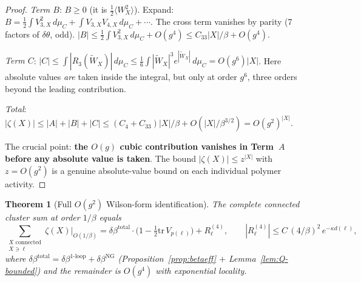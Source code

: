 \documentclass[11pt]{article}
\newtheorem{theorem}{Theorem}[section]
\theoremstyle{definition}
\newcommand{\tr}{\mathrm{tr}}
\begin{document}
\begin{proof}
\emph{Term $B$}: $B\ge 0$ (it is $\frac{1}{2}\langle W_X^2\rangle$).
Expand: $B=\frac{1}{2}\int V_{3,X}^2\,d\mu_C
+\int V_{3,X}V_{4,X}\,d\mu_C+\cdots$.
The cross term vanishes by parity (7 factors of $\delta\theta$, odd).
$|B|\le\frac{1}{2}\int V_{3,X}^2\,d\mu_C+O(g^4)
\le C_{33}|X|/\beta+O(g^4)$.

\emph{Term $C$}: $|C|\le\int|R_3(\widetilde{W}_X)|\,d\mu_C
\le\frac{1}{6}\int|\widetilde{W}_X|^3 e^{|\widetilde{W}_X|}\,d\mu_C
=O(g^6)|X|$.
Here absolute values \emph{are} taken inside the integral, but only
at order $g^6$, three orders beyond the leading contribution.

\emph{Total}: $|\zeta(X)|\le|A|+|B|+|C|
\le(C_4+C_{33})|X|/\beta+O(|X|/\beta^{3/2})
=O(g^2)^{|X|}$.

The crucial point: \textbf{the $O(g)$ cubic contribution vanishes
in Term~$A$ before any absolute value is taken}.  The bound
$|\zeta(X)|\le z^{|X|}$ with $z=O(g^2)$ is a genuine
absolute-value bound on each individual polymer activity.
\end{proof}

\begin{theorem}[Full $O(g^2)$ Wilson-form identification]%
\label{thm:wilson-id}
The complete connected cluster sum at order $1/\beta$ equals
\begin{equation}\label{eq:full-wilson-id}
\sum_{\substack{X\text{ connected}\\X\ni\ell}}
\zeta(X)\Big|_{O(1/\beta)}
=\delta\beta^{\mathrm{total}}\cdot
\bigl(1-\tfrac{1}{2}\tr\,V_{p(\ell)}\bigr)
+R_\ell^{(4)},
\qquad |R_\ell^{(4)}|\le C\,(4/\beta)^2\,e^{-\kappa d(\ell)},
\end{equation}
where $\delta\beta^{\mathrm{total}}
=\delta\beta^{1\text{-loop}}+\delta\beta^{\mathrm{NG}}$
(Proposition~\ref{prop:betaeff} $+$ Lemma~\ref{lem:Q-bounded})
and the remainder is $O(g^4)$ with exponential locality.
\end{theorem}
\end{document}
